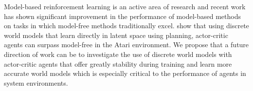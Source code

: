 Model-based reinforcement learning is an active area of research and recent work has shown significant improvement in the performance of model-based methods on tasks in which model-free methods traditionally excel. \citet{hafner2021mastering} show that using discrete world models that learn directly in latent space using planning, actor-critic agents can surpass model-free in the Atari environment. We propose that a future direction of work can be to investigate the use of discrete world models with actor-critic agents that offer greatly stability during training and learn more accurate world models which is especially critical to the performance of agents in system environments.